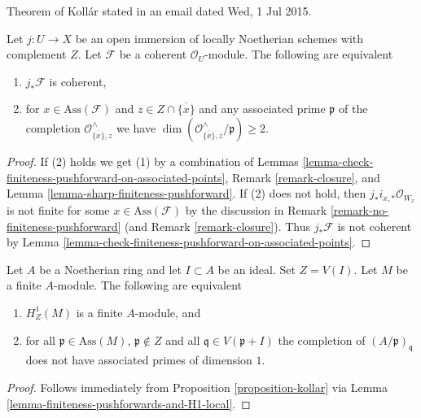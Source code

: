 \begin{proposition}[Koll\'ar]
\label{proposition-kollar}
\begin{reference}
Theorem of Koll\'ar stated in an email dated Wed, 1 Jul 2015.
\end{reference}
Let $j : U \to X$ be an open immersion of locally Noetherian schemes
with complement $Z$. Let $\mathcal{F}$ be a coherent $\mathcal{O}_U$-module.
The following are equivalent
\begin{enumerate}
\item $j_*\mathcal{F}$ is coherent,
\item for $x \in \text{Ass}(\mathcal{F})$ and
$z \in Z \cap \overline{\{x\}}$ and any associated prime
$\mathfrak p$ of the completion $\mathcal{O}_{\overline{\{x\}}, z}^\wedge$
we have $\dim(\mathcal{O}_{\overline{\{x\}}, z}^\wedge/\mathfrak p) \geq 2$.
\end{enumerate}
\end{proposition}

\begin{proof}
If (2) holds we get (1) by a combination of
Lemmas \ref{lemma-check-finiteness-pushforward-on-associated-points},
Remark \ref{remark-closure}, and
Lemma \ref{lemma-sharp-finiteness-pushforward}.
If (2) does not hold, then $j_*i_{x, *}\mathcal{O}_{W_x}$ is not finite
for some $x \in \text{Ass}(\mathcal{F})$ by the discussion in
Remark \ref{remark-no-finiteness-pushforward}
(and Remark \ref{remark-closure}).
Thus $j_*\mathcal{F}$ is not coherent by
Lemma \ref{lemma-check-finiteness-pushforward-on-associated-points}.
\end{proof}

\begin{lemma}
\label{lemma-kollar-finiteness-H1-local}
Let $A$ be a Noetherian ring and let $I \subset A$ be an ideal.
Set $Z = V(I)$. Let $M$ be a finite $A$-module. The following
are equivalent
\begin{enumerate}
\item $H^1_Z(M)$ is a finite $A$-module, and
\item for all $\mathfrak p \in \text{Ass}(M)$, $\mathfrak p \not \in Z$
and all $\mathfrak q \in V(\mathfrak p + I)$ the completion of
$(A/\mathfrak p)_\mathfrak q$ does not have associated primes
of dimension $1$.
\end{enumerate}
\end{lemma}

\begin{proof}
Follows immediately from Proposition \ref{proposition-kollar}
via Lemma \ref{lemma-finiteness-pushforwards-and-H1-local}.
\end{proof}

